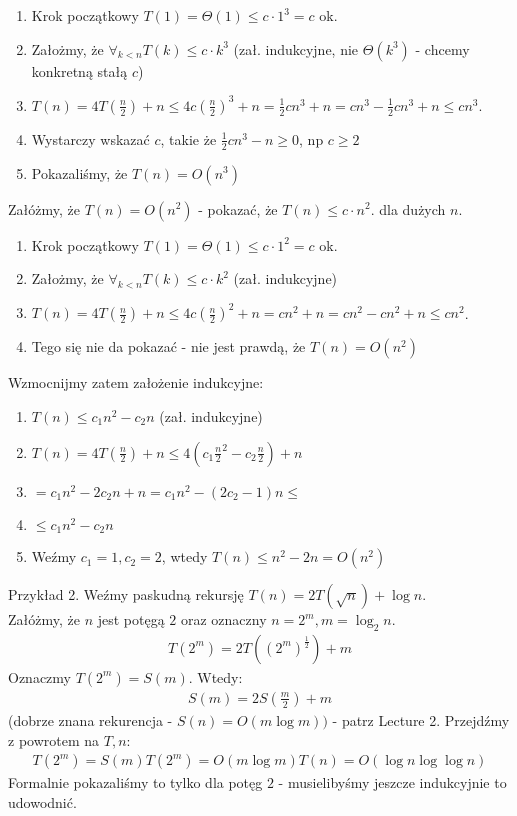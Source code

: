 \documentclass{article}
\begin{document}
\begin{enumerate}
    \item Krok początkowy $T(1) = \Theta(1) \leq c\cdot 1^3 = c$ ok.
    \item Założmy, że $\forall_{k<n}  T(k) \leq c\cdot k^3$ (zał. indukcyjne, nie $\Theta(k^3)$ - chcemy konkretną stałą $c$)
    \item $T(n) = 4T\left(\frac{n}{2}\right) + n \leq 4c\left(\frac{n}{2}\right)^3 + n = \frac{1}{2}cn^3 + n = cn^3 - \frac{1}{2}cn^3 + n \leq cn^3$.
    \item Wystarczy wskazać $c$, takie że $\frac{1}{2}cn^3 - n \geq 0$, np $c\geq 2$
    \item Pokazaliśmy, że $T(n) = O(n^3)$
\end{enumerate}
Załóżmy, że $T(n)=O(n^2)$ - pokazać, że $T(n)\leq c\cdot n^2$. dla dużych $n$.
\begin{enumerate}
    \item Krok początkowy $T(1) = \Theta(1) \leq c\cdot 1^2 = c$ ok.
    \item Założmy, że $\forall_{k<n}  T(k) \leq c\cdot k^2$ (zał. indukcyjne)
    \item $T(n) = 4T\left(\frac{n}{2}\right) + n \leq 4c\left(\frac{n}{2}\right)^2 + n = cn^2 + n = cn^2 - cn^2 + n \leq cn^2$.
    \item Tego się nie da pokazać - nie jest prawdą, że $T(n) = O(n^2)$
\end{enumerate}
Wzmocnijmy zatem założenie indukcyjne:
\begin{enumerate}
    \item $T(n) \leq c_1 n^2 - c_2 n$ (zał. indukcyjne)
    \item $T(n) = 4T\left(\frac{n}{2}\right) + n \leq 4(c_1 \frac{n}{2}^2 - c_2 \frac{n}{2}) + n$
    \item $= c_1 n^2 - 2c_2 n + n = c_1n^2 - (2c_2 -1)n \leq$
    \item $\leq c_1n^2 - c_2n$
    \item Weźmy $c_1=1, c_2=2$, wtedy $T(n) \leq n^2 - 2n = O(n^2)$
\end{enumerate}

\noindent
Przykład 2. Weźmy paskudną rekursję $T(n) = 2T(\sqrt{n}) + \log n$.\\
Załóżmy, że $n$ jest potęgą $2$ oraz oznaczny $n=2^m, m=\log_2 n$.
\begin{align}
    T(2^m) = 2T((2^m)^\frac{1}{2}) + m
\end{align}
Oznaczmy $T(2^m) = S(m)$. Wtedy:
\begin{align}
    S(m) = 2S\left(\frac{m}{2}\right) + m
\end{align}
(dobrze znana rekurencja - $S(n) = O(m\log m))$ - patrz Lecture 2.
Przejdźmy z powrotem na $T,n$:
\begin{align}
    T(2^m) = S(m)
    T(2^m) = O(m \log m)
    T(n) = O(\log n \log \log n)
\end{align}
Formalnie pokazaliśmy to tylko dla potęg $2$ - musielibyśmy jeszcze indukcyjnie to udowodnić.\\
\end{document}
